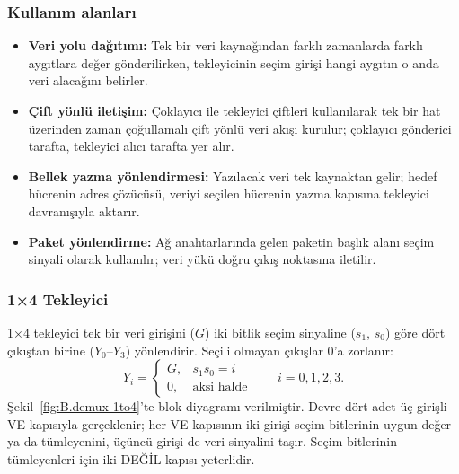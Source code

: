 \subsubsection{Kullanım alanları}
\begin{itemize}[nosep]
  \item \textbf{Veri yolu dağıtımı:} Tek bir veri kaynağından farklı zamanlarda farklı aygıtlara değer gönderilirken, tekleyicinin seçim girişi hangi aygıtın o anda veri alacağını belirler.
  \item \textbf{Çift yönlü iletişim:} Çoklayıcı ile tekleyici çiftleri kullanılarak tek bir hat üzerinden zaman çoğullamalı çift yönlü veri akışı kurulur; çoklayıcı gönderici tarafta, tekleyici alıcı tarafta yer alır.
  \item \textbf{Bellek yazma yönlendirmesi:} Yazılacak veri tek kaynaktan gelir; hedef hücrenin adres çözücüsü, veriyi seçilen hücrenin yazma kapısına tekleyici davranışıyla aktarır.
  \item \textbf{Paket yönlendirme:} Ağ anahtarlarında gelen paketin başlık alanı seçim sinyali olarak kullanılır; veri yükü doğru çıkış noktasına iletilir.
\end{itemize}

\subsubsection{1×4 Tekleyici}
1×4 tekleyici tek bir veri girişini ($G$) iki bitlik seçim sinyaline ($s_1$, $s_0$) göre dört çıkıştan birine ($Y_0$--$Y_3$) yönlendirir. Seçili olmayan çıkışlar 0'a zorlanır:
\[ Y_i = \begin{cases} G, & s_1 s_0 = i \\ 0, & \text{aksi halde} \end{cases} \qquad i = 0, 1, 2, 3. \]
Şekil~\ref{fig:B.demux-1to4}'te blok diyagramı verilmiştir. Devre dört adet üç-girişli VE kapısıyla gerçeklenir; her VE kapısının iki girişi seçim bitlerinin uygun değer ya da tümleyenini, üçüncü girişi de veri sinyalini taşır. Seçim bitlerinin tümleyenleri için iki DEĞİL kapısı yeterlidir.

